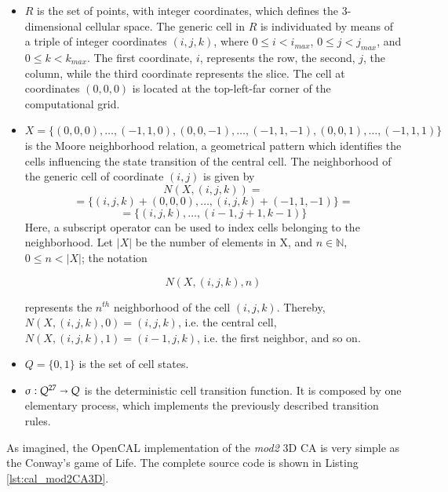 \begin{itemize}

\item $R$ is the set of points, with integer coordinates, which
  defines the 3-dimensional cellular space. The generic cell in $R$ is
  individuated by means of a triple of integer coordinates $(i, j,
  k)$, where $0 \leq i < i_{max}$, $0 \leq j < j_{max}$, and $0 \leq k
  < k_{max}$. The first coordinate, $i$, represents the row, the
  second, $j$, the column, while the third coordinate represents the
  slice. The cell at coordinates $(0,0,0)$ is located at the
  top-left-far corner of the computational grid.

\item $X = \{(0,0,0), \dots, (-1,1,0), (0,0,-1), \dots, (-1,1,-1),
  (0,0,1), \dots, (-1,1,1)\}$ is the Moore neighborhood
  relation, a geometrical pattern which identifies the cells
  influencing the state transition of the central cell. The
  neighborhood of the generic cell of coordinate $(i, j)$ is given by
  $$N(X, (i, j, k)) = $$
  $$= \{(i, j, k)+(0,0,0), \dots, (i, j, k)+(-1,1,-1)\} =$$
  $$= \{(i, j, k), \dots, (i-1,j+1,k-1)\}$$
  Here, a subscript operator can be used to index cells belonging to the
  neighborhood. Let $|X|$ be the number of elements in X, and $n \in
  \mathbb{N}$, $0 \leq n < |X|$; the notation

  $$N(X, (i, j, k), n)$$

  represents the $n^{th}$ neighborhood of the cell $(i,j,k)$. Thereby,
  $N(X, (i, j, k), 0) = (i, j, k)$, i.e. the central cell, $N(X, (i, j, k), 1)
  = (i-1, j, k)$, i.e. the first neighbor, and so on.

\item $Q = \{0, 1\}$ is the set of cell states.

\item $\sigma : Q^{27} \shortrightarrow Q$ is the deterministic cell
  transition function. It is composed by one elementary process, which
  implements the previously described transition rules.
\end{itemize}


As imagined, the OpenCAL implementation of the \emph{mod2} 3D
CA is very simple as the Conway's game of Life. The complete
source code is shown in Listing \ref{lst:cal_mod2CA3D}.



